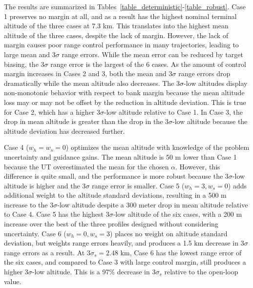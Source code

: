 \documentclass[journal ]{new-aiaa}
\begin{document}

The results are summarized in Tables~\ref{table_deterministic}-\ref{table_robust}. Case 1 preserves no margin at all, and as a result has the highest nominal terminal altitude of the three cases at 7.3 km. This translates into the highest mean altitude of the three cases, despite the lack of margin. However, the lack of margin causes poor range control performance in many trajectories, leading to large mean and 3$\sigma$ range errors. While the mean error can be reduced by target biasing, the 3$\sigma$ range error is the largest of the 6 cases. As the amount of control margin increases in Cases 2 and 3, both the mean and 3$\sigma$ range errors drop dramatically while the mean altitude also decreases. The 3$\sigma$-low altitudes display non-monotonic behavior with respect to bank margin because the mean altitude loss may or may not be offset by the reduction in altitude deviation. This is true for Case 2, which has a higher 3$\sigma$-low altitude relative to Case 1. In Case 3, the drop in mean altitude is greater than the drop in the 3$\sigma$-low altitude because the altitude deviation has decreased further. 

Case 4 ($ w_h=w_s=0 $) optimizes the mean altitude with knowledge of the problem uncertainty and guidance gains. The mean altitude is 50 m lower than Case 1 because the UT overestimated the mean for the chosen $\alpha$. However, this difference is quite small, and the performance is more robust because the 3$\sigma$-low altitude is higher and the 3$\sigma$ range error is smaller. Case 5 ($ w_h=3,w_s=0 $) adds additional weight to the altitude standard deviations, resulting in a 500 m increase to the 3$\sigma$-low altitude despite a 300 meter drop in mean altitude relative to Case 4. Case 5 has the highest 3$\sigma$-low altitude of the six cases, with a 200 m increase over the best of the three profiles designed without considering uncertainty. Case 6 ($ w_h=0, w_s=3$) places no weight on altitude standard deviation, but weights range errors heavily, and produces a 1.5 km decrease in 3$\sigma$ range errors as a result. At $3\sigma_s=2.48$ km, Case 6 has the lowest range error of the six cases, and compared to Case 3 with large control margin, still produces a higher 3$\sigma$-low altitude. This is a 97\% decrease in $3\sigma_s$ relative to the open-loop value. 
\end{document}
